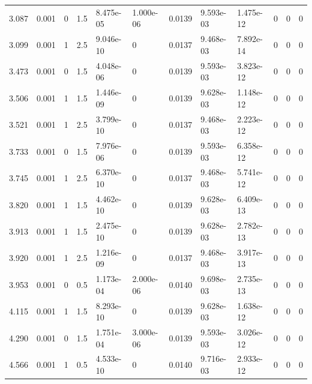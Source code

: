 \documentclass[preview]{standalone}
\begin{document}
{{\begin{tabular}{L{1.2cm}C{1.2cm} C{0.3cm}C{0.5cm} C{1.4cm}C{1.4cm} C{1.4cm}C{1.4cm} C{1.6cm}C{1.6cm} C{1.6cm}C{1.6cm}}
  3.087  &  0.001  & 0     & 1.5 &  8.475e-05  & 1.000e-06  &  0.0139&   9.593e-03& 1.475e-12 & 0   &  0 & 0  \\ 
  3.099  &  0.001  & 1     & 2.5 &  9.046e-10  & 0  &  0.0137&   9.468e-03& 7.892e-14 & 0   &  0 & 0  \\ 
  3.473  &  0.001  & 0     & 1.5 &  4.048e-06  & 0  &  0.0139&   9.593e-03& 3.823e-12 & 0   &  0 & 0  \\ 
  3.506  &  0.001  & 1     & 1.5 &  1.446e-09  & 0  &  0.0139&   9.628e-03& 1.148e-12 & 0   &  0 & 0  \\ 
  3.521  &  0.001  & 1     & 2.5 &  3.799e-10  & 0  &  0.0137&   9.468e-03& 2.223e-12 & 0   &  0 & 0  \\ 
  3.733  &  0.001  & 0     & 1.5 &  7.976e-06  & 0  &  0.0139&   9.593e-03& 6.358e-12 & 0   &  0 & 0  \\ 
  3.745  &  0.001  & 1     & 2.5 &  6.370e-10  & 0  &  0.0137&   9.468e-03& 5.741e-12 & 0   &  0 & 0  \\ 
  3.820  &  0.001  & 1     & 1.5 &  4.462e-10  & 0  &  0.0139&   9.628e-03& 6.409e-13 & 0   &  0 & 0  \\ 
  3.913  &  0.001  & 1     & 1.5 &  2.475e-10  & 0  &  0.0139&   9.628e-03& 2.782e-13 & 0   &  0 & 0  \\ 
  3.920  &  0.001  & 1     & 2.5 &  1.216e-09  & 0  &  0.0137&   9.468e-03& 3.917e-13 & 0   &  0 & 0  \\ 
  3.953  &  0.001  & 0     & 0.5 &  1.173e-04  & 2.000e-06  &  0.0140&   9.698e-03& 2.735e-13 & 0   &  0 & 0  \\ 
  4.115  &  0.001  & 1     & 1.5 &  8.293e-10  & 0  &  0.0139&   9.628e-03& 1.638e-12 & 0   &  0 & 0  \\ 
  4.290  &  0.001  & 0     & 1.5 &  1.751e-04  & 3.000e-06  &  0.0139&   9.593e-03& 3.026e-12 & 0   &  0 & 0  \\ 
  4.566  &  0.001  & 1     & 0.5 &  4.533e-10  & 0  &  0.0140&   9.716e-03& 2.933e-12 & 0   &  0 & 0  \\ 
\hline 
\end{tabular} 

}}
\end{document}
